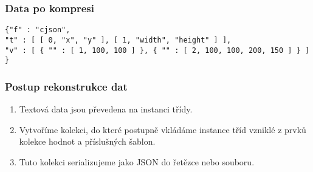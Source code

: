 \subsubsection{Data po kompresi}
\texttt{\{\hspace*{3mm}"f" : "cjson",\\
\hspace*{5mm}"t" : [ [ 0, "x", "y" ], [ 1, "width", "height" ] ],\\
\hspace*{5mm}"v" : [ \{ "" : [ 1, 100, 100 ] \}, \{ "" : [ 2, 100, 100, 200, 150 ] \} ] \}}

\subsubsection{Postup rekonstrukce dat}
\begin{enumerate}
\item Textová data jsou převedena na instanci třídy.
\item Vytvoříme kolekci, do které postupně vkládáme instance tříd vzniklé z prvků kolekce hodnot a příslušných šablon.
\item Tuto kolekci serializujeme jako JSON do řetězce nebo souboru.
\end{enumerate}